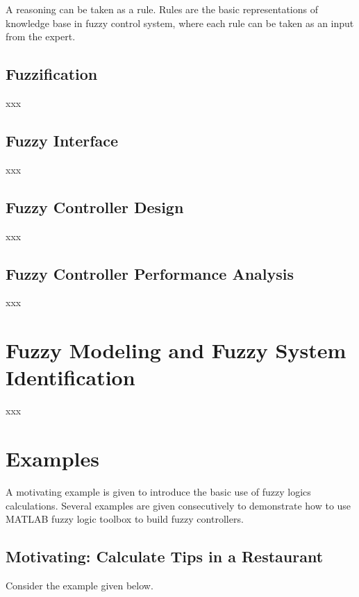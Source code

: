 A reasoning can be taken as a rule. Rules are the basic representations of knowledge base in fuzzy control system, where each rule can be taken as an input from the expert.

\subsection{Fuzzification}

xxx

\subsection{Fuzzy Interface}

xxx

\subsection{Fuzzy Controller Design}

xxx

\subsection{Fuzzy Controller Performance Analysis}

xxx

\section{Fuzzy Modeling and Fuzzy System Identification}

xxx

\section{Examples}

A motivating example is given to introduce the basic use of fuzzy logics calculations. Several examples are given consecutively to demonstrate how to use MATLAB fuzzy logic toolbox to build fuzzy controllers.

\subsection{Motivating: Calculate Tips in a Restaurant}

Consider the example given below.

